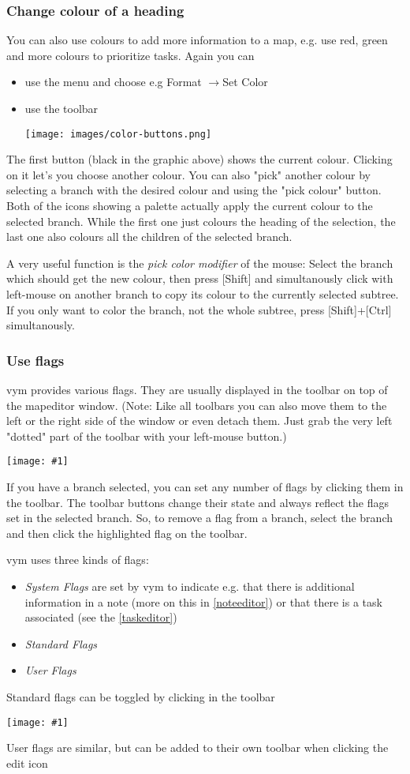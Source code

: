 \documentclass[12pt,a4paper]{article}
\newlength{\maximgwidth}
\newcommand{\maximage}[1]{  
    \begin{center}
        \texttt{[image: \#1]} 
    \end{center}
}
\newcommand{\vym}{{\sc vym }}
\newcommand{\ra}{$\longrightarrow$}
\newcommand{\key}[1]{[#1]}
\begin{document}
\subsubsection*{Change colour of a heading}
You can also use colours to add more information to a map, e.g. use
red, green and more colours to prioritize tasks. Again you can
\begin{itemize}
    \item use the menu and choose e.g Format \ra Set Color
    \item use the toolbar
        \begin{center}
            \texttt{[image: images/color-buttons.png]}
        \end{center}    
\end{itemize}
The first button (black in the graphic above) shows the current colour.
Clicking on it let's you choose another colour. You can also "pick"
another colour by selecting a branch with the desired colour and using
the "pick colour" button. Both of the icons showing a palette actually
apply the current colour to the selected branch. While the first one
just colours the heading of the selection, the last one also colours all
the children of the selected branch.

A very useful function is the {\em pick color modifier} of the mouse:
Select the branch which should get the new colour, then press
\key{Shift} and simultanously click with left-mouse on another branch to
copy its colour to the currently selected subtree. If you only want to
color the branch, not the whole subtree, press \key{Shift}+\key{Ctrl}
simultanously. 

\subsubsection*{Use flags}
\vym provides various flags. They are usually displayed in the toolbar
on top of the mapeditor window. (Note: Like all toolbars you can also
move them to the left or the right side of the window or even detach
them. Just grab the very left "dotted" part of the toolbar with your
left-mouse button.) 
\maximage{images/default-flags.png} 
If you have a branch selected, you can set any number of flags by
clicking them in the toolbar. The toolbar buttons change their state and
always reflect the flags set in the selected branch. So, to remove a
flag from a branch, select the branch and then click the highlighted
flag on the toolbar.

\vym uses three kinds of flags: 
\begin{itemize}
    \item {\em System Flags}
        are set by \vym to indicate e.g. that there is additional
        information in a note (more on this in \ref{noteeditor}) or 
        that there is a task associated (see the \ref{taskeditor})
    \item {\em Standard Flags}
    \item {\em User Flags} 
\end{itemize}
Standard flags can be toggled by clicking in the toolbar
    \maximage{images/default-flags.png}
User flags are similar, but can be added to their own toolbar when clicking the edit icon
\end{document}

